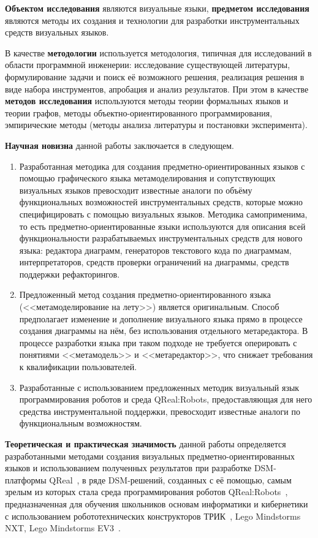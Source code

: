 \textbf{Объектом исследования} являются визуальные языки, \textbf{предметом исследования} 
являются методы их создания и технологии для разработки инструментальных средств визуальных языков.

В качестве \textbf{методологии} используется методология, типичная для исследований в 
области программной инженерии: исследование существующей литературы, формулирование задачи 
и поиск её возможного решения, реализация решения в виде набора инструментов, апробация 
и анализ результатов. При этом в качестве \textbf{методов исследования} используются 
методы теории формальных языков и теории графов, методы объектно-ориентированного программирования, 
эмпирические методы (методы анализа литературы и постановки эксперимента).

\textbf{Научная новизна} данной работы заключается в следующем.
\begin{enumerate}
	\item Разработанная методика для создания предметно-ориентированных языков с помощью 
		графического языка метамоделирования и сопутствующих визуальных языков превосходит 
		известные аналоги по объёму функциональных возможностей инструментальных средств, 
		которые можно специфицировать с помощью визуальных языков. Методика самоприменима, то есть
		предметно-ориентированные языки используются для описания всей функциональности 
		разрабатываемых инструментальных средств для нового языка: редактора диаграмм, 
		генераторов текстового кода по диаграммам, интерпретаторов, средств проверки ограничений 
		на диаграммы, средств поддержки рефакторингов.
	\item Предложенный метод создания предметно-ориентированного языка (<<метамоделирование на лету>>)
		является оригинальным. Способ предполагает изменение и дополнение визуального языка прямо в 
		процессе создания диаграммы на нём, без использования отдельного метаредактора. В процессе 
		разработки языка при таком подходе не требуется оперировать с понятиями <<метамодель>> и 
		<<метаредактор>>, что снижает требования к квалификации пользователей.
	\item Разработанные с использованием предложенных методик визуальный язык программирования роботов 
		и среда QReal:Robots, предоставляющая для него средства инструментальной поддержки, 
		превосходит известные аналоги по функциональным возможностям.
\end{enumerate}

\textbf{Теоретическая и практическая значимость} данной работы определяется разработанными 
методами создания визуальных предметно-ориентированных языков и использованием полученных 
результатов при разработке \ac{DSM}-платформы QReal~\cite{terekhov2009architecture, kuzenkova2011qreal}, 
в ряде \ac{DSM}-решений, созданных с её помощью, самым зрелым из которых стала среда программирования 
роботов QReal:Robots~\cite{bryksin2011robots}, предназначенная для обучения 
школьников основам информатики и кибернетики с использованием робототехнических 
конструкторов ТРИК~\cite{trik}, Lego Mindstorms NXT, Lego Mindstorms EV3~\cite{mindstorms}.

